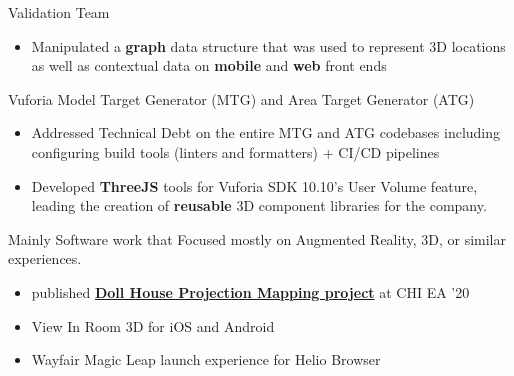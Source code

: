 \documentclass[]{plushcv}
\begin{document}
\begin{minipage}[t]{0.70\textwidth}
    \begin{tightemize}
        \sectionsep
        \item Validation Team
        \begin{itemize}
            \item Manipulated a \textbf{graph} data structure that was used to
                  represent 3D locations as well as contextual data
                  on \textbf{mobile} and \textbf{web} front ends
        \end{itemize}
        \item Vuforia Model Target Generator (MTG) and Area Target Generator (ATG)
        \begin{itemize}
            \item Addressed Technical Debt on the entire MTG and ATG codebases including
                  configuring build tools (linters and formatters) + CI/CD pipelines                  
            \item Developed \textbf{ThreeJS} tools for Vuforia SDK 10.10's User Volume feature, leading the creation of \textbf{reusable} 3D component libraries for the company.

        \end{itemize}
    \end{tightemize}
    \sectionsep

    \begin{tightemize}
        \sectionsep
        \item Mainly Software work that Focused mostly on Augmented Reality, 3D, or similar experiences.
        \begin{itemize}
            \item published \textbf{\href{https://dl.acm.org/doi/10.1145/3334480.3383180}{Doll House Projection Mapping project}} at CHI EA ’20
            \item View In Room 3D for iOS and Android
            \item Wayfair Magic Leap launch experience for Helio Browser
        \end{itemize}
    \end{tightemize}
    \sectionsep


\end{minipage}
\end{document}
